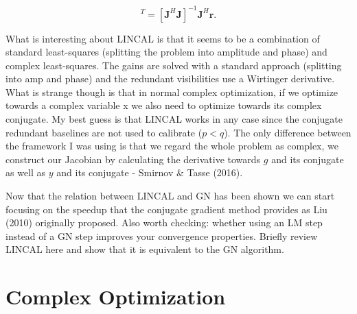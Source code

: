 \documentclass[a4paper,fleqn,usenatbib]{mnras}
\begin{document}
\begin{equation}
[\boldsymbol{\Delta \eta},\boldsymbol{\Delta \varphi},\boldsymbol{\Delta y}]^T = [\boldsymbol{J}^H\boldsymbol{J}]^{-1}\boldsymbol{J}^H\boldsymbol{r}.
\end{equation}

What is interesting about LINCAL is that it seems to be a combination of standard least-squares (splitting the problem into amplitude and phase) and 
complex least-squares. The gains are solved with a standard approach (splitting into amp and phase) and the redundant visibilities use a Wirtinger derivative. What is strange though is that in normal complex optimization, if we optimize towards a complex variable x we also need to optimize towards
its complex conjugate. My best guess is that LINCAL works in any case since the conjugate redundant baselines are not used to calibrate ($p<q$). The only difference between the framework I was using is that
we regard the whole problem as complex, we construct our Jacobian by calculating the derivative towards $g$ and its conjugate as well as $y$ and its conjugate - Smirnov \& Tasse (2016). 

Now that the relation between LINCAL and GN has been shown we can start focusing on the speedup that the conjugate gradient method provides as Liu (2010) originally proposed.
Also worth checking: whether using an LM step instead of a GN step improves your convergence properties.
Briefly review LINCAL here and show that it is equivalent to the GN algorithm.

\section{Complex Optimization}
\end{document}
